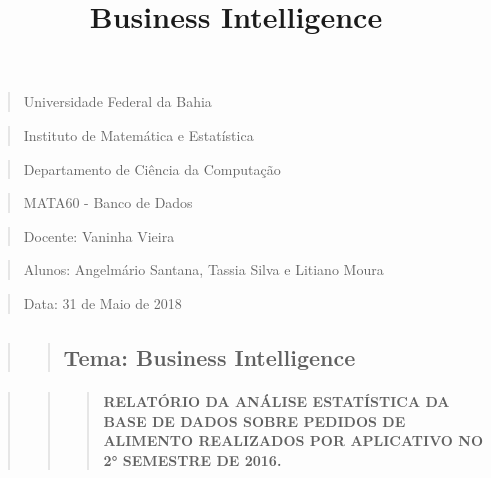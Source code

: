 \documentclass[11pt]{article}
\title{Business Intelligence}
\begin{document}
    
    
    \maketitle
    
    

    
    \begin{quote}
Universidade Federal da Bahia
\end{quote}

\begin{quote}
Instituto de Matemática e Estatística
\end{quote}

\begin{quote}
Departamento de Ciência da Computação
\end{quote}

\begin{quote}
MATA60 - Banco de Dados
\end{quote}

\begin{quote}
Docente: Vaninha Vieira
\end{quote}

\begin{quote}
Alunos: Angelmário Santana, Tassia Silva e Litiano Moura
\end{quote}

\begin{quote}
Data: 31 de Maio de 2018
\end{quote}

\begin{quote}
\begin{quote}
\subsection{Tema: Business
Intelligence}\label{tema-business-intelligence}
\end{quote}
\end{quote}

\begin{quote}
\begin{quote}
\begin{quote}
\mbox{}%
\paragraph{RELATÓRIO DA ANÁLISE ESTATÍSTICA DA BASE DE DADOS SOBRE
PEDIDOS DE ALIMENTO REALIZADOS POR APLICATIVO NO 2° SEMESTRE DE
2016.}\label{relatuxf3rio-da-anuxe1lise-estatuxedstica-da-base-de-dados-sobre-pedidos-de-alimento-realizados-por-aplicativo-no-2-semestre-de-2016.}
\end{quote}
\end{quote}
\end{quote}
\end{document}
